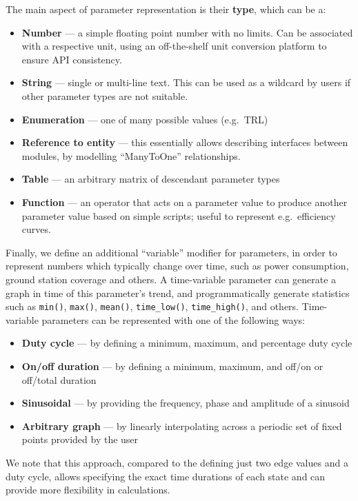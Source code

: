 \documentclass[]{iac}
\def\todo#1{}
\begin{document}
The main aspect of parameter representation is their \textbf{type}, which can be a:
\begin{itemize}[itemsep=1ex]
    \item \textbf{Number} --- a simple floating point number with no limits. Can be associated with a respective unit, using an off-the-shelf unit conversion platform to ensure \acs{API} consistency.
    \item \textbf{String} --- single or multi-line text. This can be used as a wildcard by users if other parameter types are not suitable.
    \item \textbf{Enumeration} --- one of many possible values (e.g.~\acs{TRL})
    \item \textbf{Reference to entity} --- this essentially allows describing interfaces between modules, by modelling ``ManyToOne'' relationships.
    \item \textbf{Table} --- an arbitrary matrix of descendant parameter types
    \item \textbf{Function} --- an operator that acts on a parameter value to produce another parameter value based on simple scripts; useful to represent e.g.~efficiency curves.
\end{itemize}

Finally, we define an additional ``variable'' modifier for parameters, in order to represent numbers which typically change over time, such as power consumption, ground station coverage and others. A time-variable parameter can generate a graph in time of this parameter's trend, and programmatically generate statistics such as
\texttt{min()},
\texttt{max()},
\texttt{mean()},
\texttt{time_low()},
\texttt{time_high()}, and others. Time-variable parameters can be represented with one of the following ways:
\begin{itemize}[itemsep=-1ex]
    \item \textbf{Duty cycle} --- by defining a minimum, maximum, and percentage duty cycle
    \item \textbf{On/off duration} --- by defining a minimum, maximum, and off/on or off/total duration
    \item \textbf{Sinusoidal} --- by providing the frequency, phase and amplitude of a sinusoid
    \item \textbf{Arbitrary graph} --- by linearly interpolating across a periodic set of fixed points provided by the user
\end{itemize}
We note that this approach, compared to the defining just two edge values and a duty cycle, allows specifying the exact time durations of each state and can provide more flexibility in calculations. \todo{for example by doing point-based operations and not acting only on the aggregate}
\end{document}
